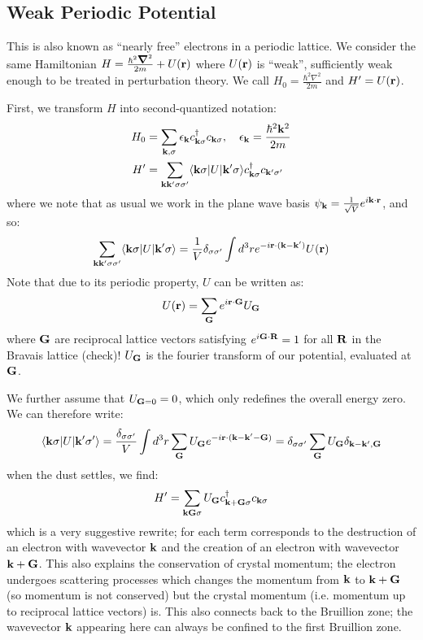 \subsection{Weak Periodic Potential}
This is also known as ``nearly free'' electrons in a periodic lattice. We consider the same Hamiltonian $H = \frac{\hbar^2\nabla^2}{2m} + U(\v{r})$ where $U(\mathbf{r})$ is ``weak'', sufficiently weak enough to be treated in perturbation theory. We call $H_0 = \frac{\hbar^2\nabla^2}{2m}$ and $H' = U(\mathbf{r})$.

First, we transform $H$ into second-quantized notation:
\begin{equation}
    \begin{split}
        H_0 &= \sum_{\mathbf{k}, \sigma} \epsilon_{\mathbf{k}}c^\dagger_{\mathbf{k}\sigma}c_{\mathbf{k}\sigma}, \quad \epsilon_{\mathbf{k}} = \frac{\hbar^2\mathbf{k}^2}{2m}
        \\ H' &= \sum_{\mathbf{k}\mathbf{k}'\sigma\sigma'}\langle \mathbf{k}\sigma \rvert U\lvert \mathbf{k}'\sigma \rangle c_{\mathbf{k}\sigma}^\dagger c_{\mathbf{k}'\sigma'}
    \end{split}
\end{equation}
where we note that as usual we work in the plane wave basis $\psi_{\mathbf{k}} = \frac{1}{\sqrt{V}}e^{i\mathbf{k} \cdot \mathbf{r}}$, and so:
\begin{equation}
    \sum_{\mathbf{k}\mathbf{k}'\sigma\sigma'}\langle \mathbf{k}\sigma \rvert U\lvert \mathbf{k}'\sigma \rangle = \frac{1}{V}\delta_{\sigma\sigma'}\int d^3 r e^{-i\mathbf{r}\cdot(\mathbf{k} - \mathbf{k}')}U(\mathbf{r})
\end{equation}
Note that due to its periodic property, $U$ can be written as:
\begin{equation}
    U(\mathbf{r}) = \sum_{\mathbf{G}}e^{i\mathbf{r} \cdot \mathbf{G}}U_{\mathbf{G}}
\end{equation}
where $\mathbf{G}$ are reciprocal lattice vectors satisfying $e^{i\mathbf{G} \cdot \mathbf{R}} = 1$ for all $\mathbf{R}$ in the Bravais lattice (check)! $U_{\mathbf{G}}$ is the fourier transform of our potential, evaluated at $\mathbf{G}$.

We further assume that $U_{\mathbf{G} = 0} = 0$, which only redefines the overall energy zero. We can therefore write:
\begin{equation}
    \langle \mathbf{k}\sigma \rvert U\lvert \mathbf{k}'\sigma' \rangle = \frac{\delta_{\sigma\sigma'}}{V} \int d^3r \sum_{\mathbf{G}} U_{\mathbf{G}} e^{-i\mathbf{r}\cdot(\mathbf{k} - \mathbf{k'} - \mathbf{G})} = \delta_{\sigma\sigma'}\sum_{\mathbf{G}}U_{\mathbf{G}}\delta_{\mathbf{k} - \mathbf{k}', \mathbf{G}}
\end{equation}
when the dust settles, we find:
\begin{equation}
    H' = \sum_{\mathbf{k}\mathbf{G}\sigma} U_{\mathbf{G}} c^\dagger_{\mathbf{k} + \mathbf{G}\sigma}c_{\mathbf{k}\sigma}
\end{equation}
which is a very suggestive rewrite; for each term corresponds to the destruction of an electron with wavevector $\mathbf{k}$ and the creation of an electron with wavevector $\mathbf{k} + \mathbf{G}$. This also explains the conservation of crystal momentum; the electron undergoes scattering processes which changes the momentum from $\mathbf{k}$ to $\mathbf{k} + \mathbf{G}$ (so momentum is not conserved) but the crystal momentum (i.e. momentum up to reciprocal lattice vectors) is. This also connects back to the Bruillion zone; the wavevector $\mathbf{k}$ appearing here can always be confined to the first Bruillion zone.

